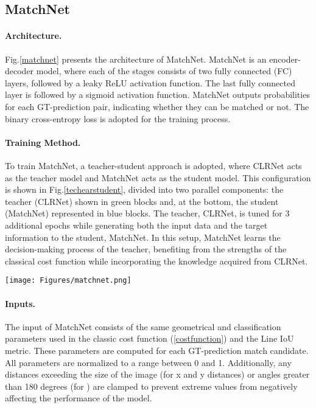 \documentclass[10pt,twocolumn,letterpaper]{article}
\begin{document}
\subsection{\textbf{MatchNet}}
\paragraph{\textbf{Architecture.}}Fig.\ref{matchnet} presents the architecture of MatchNet. MatchNet is an encoder-decoder model, where each of the stages consists of two fully connected (FC) layers, followed by a leaky ReLU activation function. The last fully connected layer is followed by a sigmoid activation function. MatchNet outputs probabilities for each GT-prediction pair, indicating whether they can be matched or not. The binary cross-entropy loss is adopted for the training process. 

\paragraph{\textbf{Training Method.}}To train MatchNet, a teacher-student approach is adopted, where CLRNet acts as the teacher model and MatchNet acts as the student model. This configuration is shown in Fig.\ref{techearstudent},  divided into two parallel components: the teacher (CLRNet) shown in green blocks and, at the bottom, the student (MatchNet) represented in blue blocks. The teacher, CLRNet, is tuned for 3 additional epochs while generating both the input data and the target information to the student, MatchNet. In this setup, MatchNet learns the decision-making process of the teacher, benefiting from the strengths of the classical cost function while incorporating the knowledge acquired from CLRNet. 

\begin{figure*}[t]
\begin{center}
    \texttt{[image: Figures/matchnet.png]}
\caption{Architecture of MatchNet: A fully connected model for match classification. As an input, MatchNet receives geometrical parameters of  predictions in relative to each one of the GT, and outputs probabilities defining whether the each pair is positive or negative."}
\label{matchnet}
\end{center}
\end{figure*}

\paragraph{\textbf{Inputs.}}The input of MatchNet consists of the same geometrical and classification parameters used in the classic cost function (\ref{costfunction}) and the Line IoU metric. These parameters are computed for each GT-prediction match candidate. All parameters are normalized to a range between 0 and 1. Additionally, any distances exceeding the size of the image (for x and y distances) or angles greater than 180 degrees (for ) are clamped to prevent extreme values from negatively affecting the performance of the model.
\end{document}
